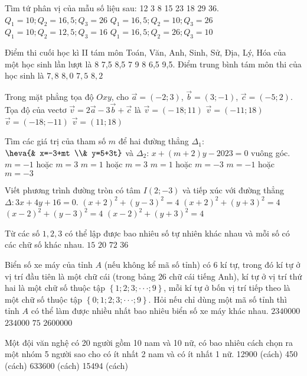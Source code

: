 \begin{ex}
Tìm tứ phân vị của mẫu số liệu sau: 12 3 8 15 23 18 29 36.
\choice
{$Q_1=10;Q_2=16{,}5;Q_3=26$}
{$Q_1=16{,}5;Q_2=10;Q_3=26$}
{$Q_1=10;Q_2=12{,}5;Q_3=16$}
{$Q_1=16{,}5;Q_2=26;Q_3=10$}
\end{ex}
\begin{ex}
	Điểm thi cuối học kì II tám môn Toán, Văn, Anh, Sinh, Sử, Địa, Lý, Hóa của một học sinh lần lượt là 8 7{,}5 8{,}5 7 9 8 6{,}5 9{,}5. Điểm trung bình tám môn thi của học sinh là 
	\choice
	{$7{,}8$}
	{$8{,}0$}
	{$7{,}5$}
	{$8{,}2$}
\end{ex}
\begin{ex}
	Trong mặt phẳng tọa độ $Oxy$, cho $\vec{a}=(-2;3)$, $\vec{b}=(3;-1)$, $\vec{c}=(-5;2)$. Tọa độ của vectơ $\vec{v}=2\vec{a}-3\vec{b}+\vec{c}$ là
	\choice
	{$\vec{v}=\left(-\,18;11\right)$}
	{$\vec{v}=(-11;18)$}
	{$\vec{v}=(-18;-11)$}
	{$\vec{v}=(11;18)$}
\end{ex}
\begin{ex}
	Tìm các giá trị của tham số $m$ để hai đường thẳng $\Delta _1$: $\heva{& x=-3+mt \\& y=5+3t}$ và $\Delta _2$: $x+(m+2)y-2023=0$ vuông góc.
	\choice
	{$m=-1$ hoặc $m=3$}
	{$m=1$ hoặc $m=3$}
	{$m=1$ hoặc $m=-3$}
	{$m=-1$ hoặc $m=-3$}
\end{ex}
\begin{ex}
	Viết phương trình đường tròn có tâm $I(2;-3)$ và tiếp xúc với đường thẳng $\Delta \colon 3x+4y+16=0$.
	\choice
	{$(x+2)^2+{{(y-3)}^2}=4$}
	{${{(x+2)}^2}+{{(y+3)}^2}=4$}
	{${{(x-2)}^2}+{{(y-3)}^2}=4$}
	{${{(x-2)}^2}+{{(y+3)}^2}=4$}
\end{ex}
\begin{ex}
Từ các số $1{,}2,3$ có thể lập được bao nhiêu số tự nhiên khác nhau và mỗi số có các chữ số khác nhau.
\choice
{$15$}
{$20$}
{$72$}
{$36$}
\end{ex}
\begin{ex}
Biển số xe máy của tỉnh $A$ (nếu không kể mã số tỉnh) có $6$ kí tự, trong đó kí tự ở vị trí đầu tiên là một chữ cái (trong bảng $26$ chữ cái tiếng Anh), kí tự ở vị trí thứ hai là một chữ số thuộc tập $\left\{ 1;2;3; \cdot \cdot \cdot ;9 \right\}$, mỗi kí tự ở bốn vị trí tiếp theo là một chữ số thuộc tập $\left\{ 0;1;2;3; \cdot \cdot \cdot ;9 \right\}$. Hỏi nếu chỉ dùng một mã số tỉnh thì tỉnh $A$ có thể làm được nhiều nhất bao nhiêu biển số xe máy khác nhau.
\choice
{$2340000$}
{$234000$}
{$75$}
{$2600000$}
\end{ex}
\begin{ex}
Một đội văn nghệ có 20 người gồm 10 nam và 10 nữ, có bao nhiêu cách chọn ra một nhóm 5 người sao cho có ít nhất 2 nam và có ít nhất 1 nữ.
\choice
{12900 (cách)}
{450 (cách)}
{633600 (cách)}
{15494 (cách)}
\end{ex}
